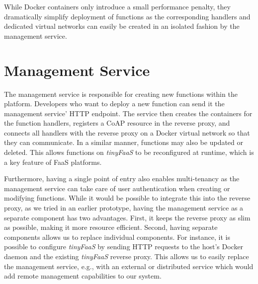 While Docker containers only introduce a small performance penalty, they dramatically simplify deployment of functions as the corresponding handlers and dedicated virtual networks can easily be created in an isolated fashion by the management service.

\section{Management Service}
\label{sec:management}

The management service is responsible for creating new functions within the platform.
Developers who want to deploy a new function can send it the management service' HTTP endpoint.
The service then creates the containers for the function handlers, registers a CoAP resource in the reverse proxy, and connects all handlers with the reverse proxy on a Docker virtual network so that they can communicate.
In a similar manner, functions may also be updated or deleted.
This allows functions on \textit{tinyFaaS} to be reconfigured at runtime, which is a key feature of FaaS platforms.

Furthermore, having a single point of entry also enables multi-tenancy as the management service can take care of user authentication when creating or modifying functions.
While it would be possible to integrate this into the reverse proxy, as we tried in an earlier prototype, having the management service as a separate component has two advantages.
First, it keeps the reverse proxy as slim as possible, making it more resource efficient.
Second, having separate components allows us to replace individual components.
For instance, it is possible to configure \textit{tinyFaaS} by sending HTTP requests to the host's Docker daemon and the existing \textit{tinyFaaS} reverse proxy.
This allows us to easily replace the management service, e.g., with an external or distributed service which would add remote management capabilities to our system.
